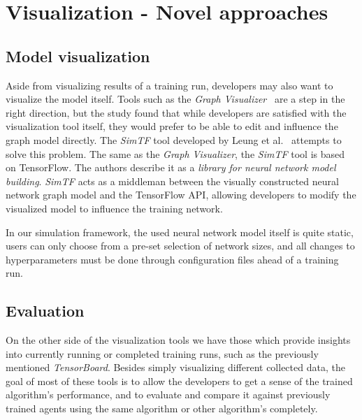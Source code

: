 \section{Visualization - Novel approaches}

\subsection{Model visualization}

Aside from visualizing results of a training run, developers may also want to visualize the model itself. Tools such as the \emph{Graph Visualizer}~\cite{GraphVisualizer} are a step in the right direction, but the study found that while developers are satisfied with the visualization tool itself, they would prefer to be able to edit and influence the graph model directly. The \emph{SimTF} tool developed by Leung et al.~\cite{NeuralNetworkVisualization} attempts to solve this problem. The same as the \emph{Graph Visualizer}, the \emph{SimTF} tool is based on TensorFlow. The authors describe it as a \emph{library for neural network model building}. \emph{SimTF} acts as a middleman between the visually constructed neural network graph model and the TensorFlow API, allowing developers to modify the visualized model to influence the training network.

In our simulation framework, the used neural network model itself is quite static, users can only choose from a pre-set selection of network sizes, and all changes to hyperparameters must be done through configuration files ahead of a training run.

\subsection{Evaluation}

On the other side of the visualization tools we have those which provide insights into currently running or completed training runs, such as the previously mentioned \emph{TensorBoard}. Besides simply visualizing different collected data, the goal of most of these tools is to allow the developers to get a sense of the trained algorithm's performance, and to evaluate and compare it against previously trained agents using the same algorithm or other algorithm's completely.

